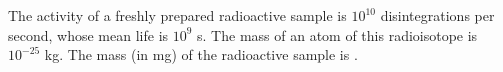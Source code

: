 
\item The activity of a freshly prepared radioactive sample is $10^{10}$ disintegrations per second, whose mean life is $10^9$ s. The mass of an atom of this radioisotope is $10^{-25}$ kg. The mass (in mg) of the radioactive sample is \underline{\hspace{2.5cm}}.
